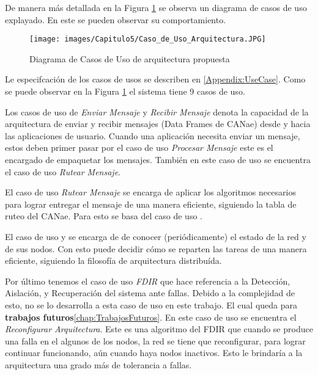 De manera más detallada en la Figura \ref{fig:DiagramaCUArqPropuesta} se
observa un diagrama de casos de uso explayado. En este se pueden observar su
comportamiento.

\begin{figure}[h!]
 \centering
 \texttt{[image: images/Capitulo5/Caso\_de\_Uso\_Arquitectura.JPG]}
  \caption{Diagrama de Casos de Uso de arquitectura propuesta}
\label{fig:DiagramaCUArqPropuesta}
\end{figure} 

Le especifcación de los casos de usos se describen en \ref{Appendix:UseCase}.
Como se puede observar en la Figura \ref{fig:DiagramaCUArqPropuesta}
el sistema tiene 9 casos de uso.

Los casos de uso de \textit{Enviar Mensaje} y \textit{Recibir Mensaje} denota la
capacidad de la arquitectura de enviar y recibir mensajes (Data Frames de
CANae) desde y hacia las aplicaciones de usuario. Cuando una aplicación
necesita enviar un mensaje, estos deben primer pasar por el caso de uso
\textit{Procesar Mensaje} este es el encargado de empaquetar los mensajes.
También en este caso de uso se encuentra el caso de uso \textit{Rutear
  Mensaje}.

El caso de uso \textit{Rutear Mensaje} se encarga de aplicar los algoritmos
necesarios para lograr entregar el mensaje de una manera eficiente, siguiendo
la tabla de ruteo del CANae. Para esto se basa del caso de uso .

El caso de uso  y  se encarga de
de conocer (periódicamente) el estado de la red y de sus nodos. Con esto puede
decidir cómo se reparten las tareas de una manera eficiente, siguiendo
la filosofía de arquitectura distribuída.

Por último tenemos el caso de uso \textit{FDIR} que hace referencia a la
Detección, Aislación, y Recuperación del sistema ante fallas. Debido a la
complejidad de esto, no se lo desarrolla a esta caso de uso en este trabajo.
El cual queda para \textbf{trabajos futuros}\ref{chap:TrabajosFuturos}. En este
caso de uso se encuentra el \textit{Reconfigurar Arquitectura}. Este es una
algoritmo del \ac{FDIR} que cuando se produce una falla en el algunos de los
nodos, la red se tiene que reconfigurar, para lograr continuar funcionando,
aún cuando haya nodos inactivos. Esto le brindaría a la arquitectura una grado
más de tolerancia a fallas. 





